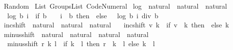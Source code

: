 %
\begin{isabellebody}%
%
%
\isadelimdocument
%
\endisadelimdocument
%
\isatagdocument
%
\isamarkuptrue%
%
\endisatagdocument
{\isafolddocument}%
%
\isadelimdocument
%
\endisadelimdocument
%
\isadelimtheory
%
\endisadelimtheory
%
\isatagtheory
{}\isamarkupfalse%
\ Random\isanewline
{}\ List\ Groups{\isacharunderscore}{\kern0pt}List\ Code{\isacharunderscore}{\kern0pt}Numeral\isanewline
{}%
\endisatagtheory
{\isafoldtheory}%
%
\isadelimtheory
%
\endisadelimtheory
%
\isadelimdocument
%
\endisadelimdocument
%
\isatagdocument
%
\isamarkuptrue%
%
\endisatagdocument
{\isafolddocument}%
%
\isadelimdocument
%
\endisadelimdocument
{}\isamarkupfalse%
\ log\ {\isacharcolon}{\kern0pt}{\isacharcolon}{\kern0pt}\ {\isachardoublequoteopen}natural\ {\isasymRightarrow}\ natural\ {\isasymRightarrow}\ natural{\isachardoublequoteclose}\ \isanewline
\ \ {\isachardoublequoteopen}log\ b\ i\ {\isacharequal}{\kern0pt}\ {\isacharparenleft}{\kern0pt}if\ b\ {\isasymle}\ {}\ {\isasymor}\ i\ {\isacharless}{\kern0pt}\ b\ then\ {}\ else\ {}\ {\isacharplus}{\kern0pt}\ log\ b\ {\isacharparenleft}{\kern0pt}i\ div\ b{\isacharparenright}{\kern0pt}{\isacharparenright}{\kern0pt}{\isachardoublequoteclose}\isanewline
\isanewline
{}\isamarkupfalse%
\ inc{\isacharunderscore}{\kern0pt}shift\ {\isacharcolon}{\kern0pt}{\isacharcolon}{\kern0pt}\ {\isachardoublequoteopen}natural\ {\isasymRightarrow}\ natural\ {\isasymRightarrow}\ natural{\isachardoublequoteclose}\ \isanewline
\ \ {\isachardoublequoteopen}inc{\isacharunderscore}{\kern0pt}shift\ v\ k\ {\isacharequal}{\kern0pt}\ {\isacharparenleft}{\kern0pt}if\ v\ {\isacharequal}{\kern0pt}\ k\ then\ {}\ else\ k\ {\isacharplus}{\kern0pt}\ {}{\isacharparenright}{\kern0pt}{\isachardoublequoteclose}\isanewline
\isanewline
{}\isamarkupfalse%
\ minus{\isacharunderscore}{\kern0pt}shift\ {\isacharcolon}{\kern0pt}{\isacharcolon}{\kern0pt}\ {\isachardoublequoteopen}natural\ {\isasymRightarrow}\ natural\ {\isasymRightarrow}\ natural\ {\isasymRightarrow}\ natural{\isachardoublequoteclose}\ \isanewline
\ \ {\isachardoublequoteopen}minus{\isacharunderscore}{\kern0pt}shift\ r\ k\ l\ {\isacharequal}{\kern0pt}\ {\isacharparenleft}{\kern0pt}if\ k\ {\isacharless}{\kern0pt}\ l\ then\ r\ {\isacharplus}{\kern0pt}\ k\ {\isacharminus}{\kern0pt}\ l\ else\ k\ {\isacharminus}{\kern0pt}\ l{\isacharparenright}{\kern0pt}{\isachardoublequoteclose}%

\end{isabellebody}
